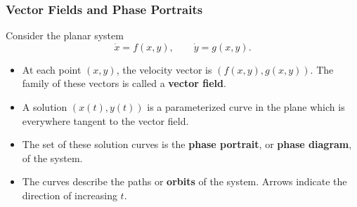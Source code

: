 \documentclass[9pt,aspectratio=169]{beamer}
\begin{document}
\begin{frame}
    \frametitle{Vector Fields and Phase Portraits}
    Consider the planar system
    \[
        \dot x=f(x,y),\qquad \dot y=g(x,y).
    \]
    \begin{itemize}
        \item At each point $(x,y)$, the velocity vector is
        $(f(x,y),g(x,y))$. The family of these vectors is called a
        \textbf{vector field}.
        \item A solution $(x(t),y(t))$ is a parameterized curve in the
        plane which is everywhere tangent to the vector field.
        \item The set of these solution curves is the \textbf{phase
        portrait}, or \textbf{phase diagram}, of the system.
        \item The curves describe the paths or \textbf{orbits} of the
        system. Arrows indicate the direction of increasing $t$.
    \end{itemize}
\end{frame}
\end{document}
